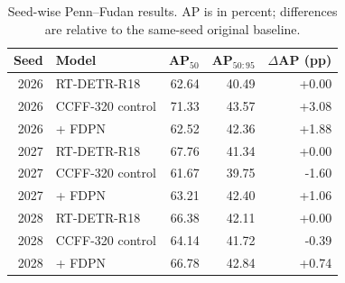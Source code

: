 \begin{table}[!htbp]
\centering
\caption{Seed-wise Penn--Fudan results. AP is in percent; differences are relative to the same-seed original baseline.}
\label{tab:robustness_seeds}
\footnotesize
\setlength{\tabcolsep}{3pt}
\begin{tabular}{rlrrr}
\toprule
Seed & Model & AP$_{50}$ & AP$_{50:95}$ & $\Delta$AP (pp)\\
\midrule
2026 & RT-DETR-R18 & 62.64 & 40.49 & +0.00\\
2026 & CCFF-320 control & 71.33 & 43.57 & +3.08\\
2026 & + FDPN & 62.52 & 42.36 & +1.88\\
\midrule
2027 & RT-DETR-R18 & 67.76 & 41.34 & +0.00\\
2027 & CCFF-320 control & 61.67 & 39.75 & -1.60\\
2027 & + FDPN & 63.21 & 42.40 & +1.06\\
\midrule
2028 & RT-DETR-R18 & 66.38 & 42.11 & +0.00\\
2028 & CCFF-320 control & 64.14 & 41.72 & -0.39\\
2028 & + FDPN & 66.78 & 42.84 & +0.74\\
\bottomrule
\end{tabular}
\end{table}
